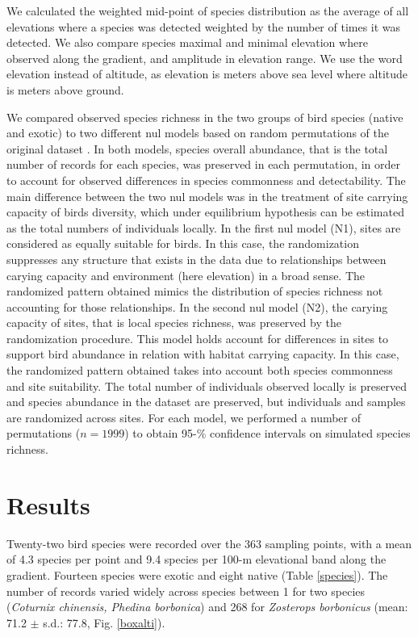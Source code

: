 \documentclass{article}\usepackage[]{graphicx}\usepackage[]{color}
\begin{document}
We calculated the weighted mid-point of species distribution as the average of all elevations where a species was detected weighted by the number of times it was detected. We also compare species maximal and minimal elevation where observed along the gradient, and amplitude in elevation range. We use the word elevation instead of altitude, as elevation is meters above sea level where altitude is meters above ground.

We compared observed species richness in the two groups of bird species (native and exotic) to two different nul models based on random permutations of the original dataset  \cite{Gotelli2000}. In both models, species overall abundance, that is the total number of records for each species, was preserved in each permutation, in order to account for observed differences in species commonness and detectability. The main difference between the two nul models was in the treatment of site carrying capacity of birds diversity, which under equilibrium hypothesis can be estimated as the total numbers of individuals locally. In the first nul model (N1), sites are considered as equally suitable for birds. In this case, the randomization suppresses any structure that exists in the data due to relationships between carying capacity and environment (here elevation) in a broad sense. The randomized pattern obtained mimics the distribution of species richness not accounting for those relationships. In the second nul model (N2), the carying capacity of sites, that is local species richness, was preserved by the randomization procedure. This model holds account for differences in sites to support bird abundance in relation with habitat carrying capacity. In this case, the randomized pattern obtained takes into account both species commonness and site suitability. The total number of individuals observed locally is preserved and species abundance in the dataset are preserved, but individuals and samples are randomized across sites. For each model, we performed a number of permutations ($n=1999$) to obtain 95-\% confidence intervals on simulated species richness. 


\section*{Results}

Twenty-two bird species were recorded over the 363 sampling points, with a mean of 4.3 species per point and 9.4 species per 100-m elevational band along the gradient.  Fourteen species were exotic and eight native (Table \ref{species}). The number of records varied widely across species between 1 for two species (\textit{Coturnix chinensis, Phedina borbonica}) and 268 for \textit{Zosterops borbonicus} (mean: 71.2 $\pm$ s.d.: 77.8, Fig. \ref{boxalti}). 
\end{document}

